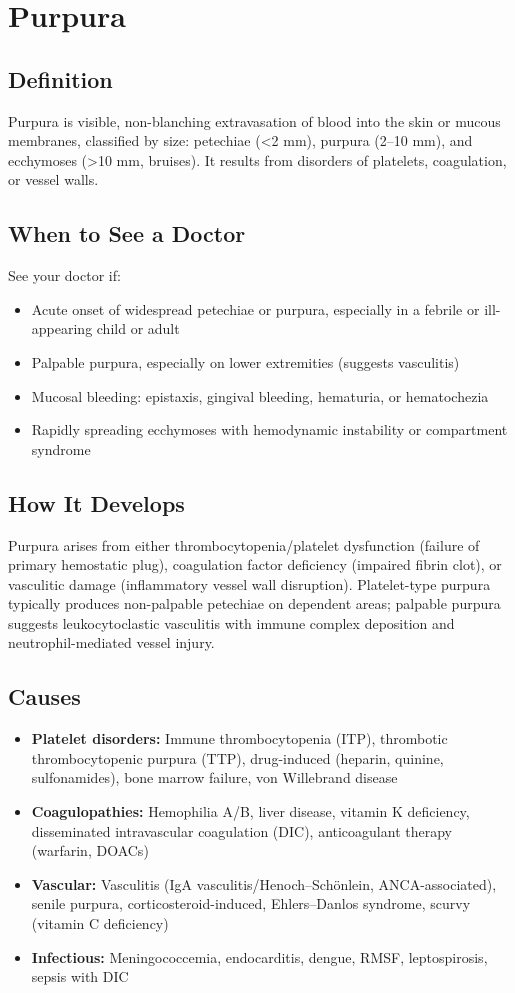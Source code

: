 \chapter{Purpura}

\section*{Definition}
Purpura is visible, non-blanching extravasation of blood into the skin or mucous membranes, classified by size: petechiae (<2 mm), purpura (2--10 mm), and ecchymoses (>10 mm, bruises). It results from disorders of platelets, coagulation, or vessel walls.

\section*{When to See a Doctor}
See your doctor if:
\begin{itemize}
  \item Acute onset of widespread petechiae or purpura, especially in a febrile or ill-appearing child or adult
  \item Palpable purpura, especially on lower extremities (suggests vasculitis)
  \item Mucosal bleeding: epistaxis, gingival bleeding, hematuria, or hematochezia
  \item Rapidly spreading ecchymoses with hemodynamic instability or compartment syndrome
\end{itemize}

\section*{How It Develops}
Purpura arises from either thrombocytopenia/platelet dysfunction (failure of primary hemostatic plug), coagulation factor deficiency (impaired fibrin clot), or vasculitic damage (inflammatory vessel wall disruption). Platelet-type purpura typically produces non-palpable petechiae on dependent areas; palpable purpura suggests leukocytoclastic vasculitis with immune complex deposition and neutrophil-mediated vessel injury.

\section*{Causes}
\begin{itemize}
  \item \textbf{Platelet disorders:} Immune thrombocytopenia (ITP), thrombotic thrombocytopenic purpura (TTP), drug-induced (heparin, quinine, sulfonamides), bone marrow failure, von Willebrand disease
  \item \textbf{Coagulopathies:} Hemophilia A/B, liver disease, vitamin K deficiency, disseminated intravascular coagulation (DIC), anticoagulant therapy (warfarin, DOACs)
  \item \textbf{Vascular:} Vasculitis (IgA vasculitis/Henoch--Sch\"onlein, ANCA-associated), senile purpura, corticosteroid-induced, Ehlers--Danlos syndrome, scurvy (vitamin C deficiency)
  \item \textbf{Infectious:} Meningococcemia, endocarditis, dengue, RMSF, leptospirosis, sepsis with DIC
\end{itemize}

